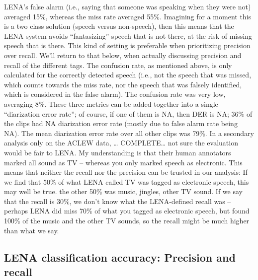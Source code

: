 \documentclass[english,floatsintext,man]{apa6}
\begin{document}
LENA's false alarm (i.e., saying that someone was speaking when they
were not) averaged 15\%, whereas the miss rate averaged 55\%. Imagining
for a moment this is a two class solution (speech versus non-speech),
then this means that the LENA system avoids \enquote{fantasizing} speech
that is not there, at the risk of missing speech that is there. This
kind of setting is preferable when prioritizing precision over recall.
We'll return to that below, when actually discussing precision and
recall of the different tags. The confusion rate, as mentioned above, is
only calculated for the correctly detected speech (i.e., not the speech
that was missed, which counts towards the miss rate, nor the speech that
was falsely identified, which is considered in the false alarm). The
confusion rate was very low, averaging 8\%. These three metrics can be
added together into a single \enquote{diarization error rate}; of
course, if one of them is NA, then DER is NA; 36\% of the clips had NA
diarization error rate (mostly due to false alarm rate being NA). The
mean diarization error rate over all other clips was 79\%. In a
secondary analysis only on the ACLEW data, \ldots{} COMPLETE\ldots{} not
sure the evaluation would be fair to LENA. My understanding is that
their human annotators marked all sound as TV -- whereas you only marked
speech as electronic. This means that neither the recall nor the
precision can be trusted in our analysis: If we find that 50\% of what
LENA called TV was tagged as electronic speech, this may well be true.
the other 50\% was music, jingles, other TV sound. If we say that the
recall is 30\%, we don't know what the LENA-defined recall was --
perhaps LENA did miss 70\% of what you tagged as electronic speech, but
found 100\% of the music and the other TV sounds, so the recall might be
much higher than what we say.

\subsection{LENA classification accuracy: Precision and
recall}\label{lena-classification-accuracy-precision-and-recall}
\end{document}
